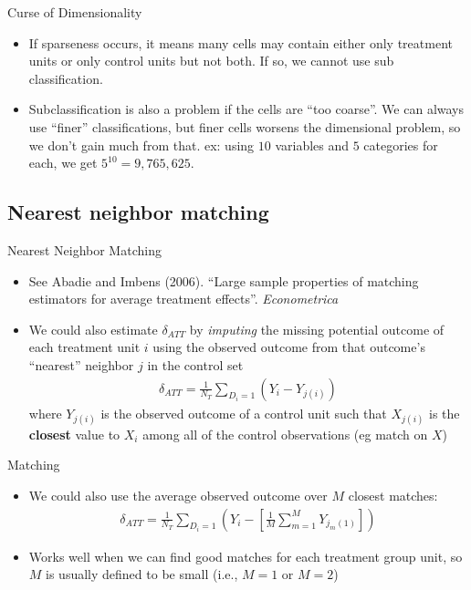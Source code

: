 \documentclass{beamer}
\begin{document}
\begin{frame}{Curse of Dimensionality}
	
	\begin{itemize}
	\item If sparseness occurs, it means many cells may contain either only treatment units or only control units but not both.  If so, we cannot use sub classification.
	\item Subclassification is also a problem if the cells are ``too coarse''.  We can always use ``finer'' classifications, but finer cells worsens the dimensional problem, so we don't gain  much from that.  ex: using $10$ variables and $5$ categories for each, we get $5^{10} = 9,765,625$.  
	\end{itemize}
\end{frame}	


\subsection{Nearest neighbor matching}

\begin{frame}{Nearest Neighbor Matching}
	
	\begin{itemize}
	\item See Abadie and Imbens (2006). ``Large sample properties of matching
        estimators for average treatment effects''.  \emph{Econometrica}
	\item We could also estimate $\delta_{ATT}$ by \emph{imputing} the missing potential outcome of each treatment unit $i$ using the observed outcome from that outcome's ``nearest'' neighbor $j$ in the control set
		\begin{eqnarray*}
		\delta_{ATT} = \frac{1}{N_T}\sum_{D_i=1} (Y_i - Y_{j(i)})
		\end{eqnarray*}where $Y_{j(i)}$ is the observed outcome of a control unit such that $X_{j(i)}$ is the \textbf{closest} value to $X_i$ among all of the control observations (eg match on $X$)
	\end{itemize}
\end{frame}

\begin{frame}{Matching}
	
	\begin{itemize}
	\item We could also use the average observed outcome over $M$ closest matches:
		\begin{eqnarray*}
		\delta_{ATT} = \frac{1}{N_T}\sum_{D_i=1}\left(Y_i-\left[\frac{1}{M}\sum_{m=1}^MY_{j_m(1)}\right]\right)
		\end{eqnarray*}
	\item Works well when we can find good matches for each treatment group unit, so $M$ is usually defined to be small (i.e., $M=1$ or $M=2$)
	\end{itemize}
\end{frame}
\end{document}
